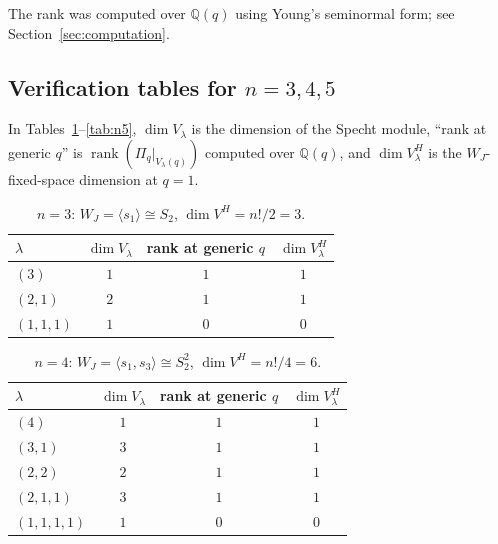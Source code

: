 \documentclass[12pt]{article}
\theoremstyle{remark}
\theoremstyle{definition}
\begin{document}
The rank was computed over $\mathbb{Q}(q)$ using Young's seminormal form; see Section~\ref{sec:computation}.

\subsection{Verification tables for $n = 3, 4, 5$}

In Tables~\ref{tab:n3}--\ref{tab:n5}, $\dim V_\lambda$ is the dimension of the Specht module,
``rank at generic $q$'' is $\operatorname{rank}(\Pi_q|_{V_\lambda(q)})$ computed over $\mathbb{Q}(q)$,
and $\dim V_\lambda^H$ is the $W_J$-fixed-space dimension at $q=1$.

\begin{table}[h]
\centering
\caption{$n = 3$: $W_J = \langle s_1 \rangle \cong S_2$, $\dim V^H = n!/2 = 3$.}
\label{tab:n3}
\begin{tabular}{@{}lccc@{}}
\toprule
$\lambda$ & $\dim V_\lambda$ & rank at generic $q$ & $\dim V_\lambda^H$ \\
\midrule
$(3)$     & $1$ & $1$ & $1$ \\
$(2,1)$   & $2$ & $1$ & $1$ \\
$(1,1,1)$ & $1$ & $0$ & $0$ \\
\bottomrule
\end{tabular}
\end{table}

\begin{table}[h]
\centering
\caption{$n = 4$: $W_J = \langle s_1, s_3 \rangle \cong S_2^2$, $\dim V^H = n!/4 = 6$.}
\label{tab:n4}
\begin{tabular}{@{}lccc@{}}
\toprule
$\lambda$ & $\dim V_\lambda$ & rank at generic $q$ & $\dim V_\lambda^H$ \\
\midrule
$(4)$       & $1$ & $1$ & $1$ \\
$(3,1)$     & $3$ & $1$ & $1$ \\
$(2,2)$     & $2$ & $1$ & $1$ \\
$(2,1,1)$   & $3$ & $1$ & $1$ \\
$(1,1,1,1)$ & $1$ & $0$ & $0$ \\
\bottomrule
\end{tabular}
\end{table}
\end{document}
